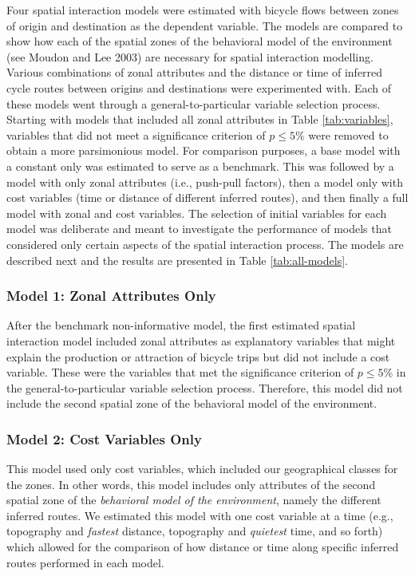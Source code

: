 \documentclass[smallextended]{svjour3}       %
\begin{document}
Four spatial interaction models were estimated with bicycle flows
between zones of origin and destination as the dependent variable. The
models are compared to show how each of the spatial zones of the
behavioral model of the environment (see Moudon and Lee 2003) are
necessary for spatial interaction modelling. Various combinations of
zonal attributes and the distance or time of inferred cycle routes
between origins and destinations were experimented with. Each of these
models went through a general-to-particular variable selection process.
Starting with models that included all zonal attributes in Table
\ref{tab:variables}, variables that did not meet a significance
criterion of \(p \le 5\)\% were removed to obtain a more parsimonious
model. For comparison purposes, a base model with a constant only was
estimated to serve as a benchmark. This was followed by a model with
only zonal attributes (i.e., push-pull factors), then a model only with
cost variables (time or distance of different inferred routes), and then
finally a full model with zonal and cost variables. The selection of
initial variables for each model was deliberate and meant to investigate
the performance of models that considered only certain aspects of the
spatial interaction process. The models are described next and the
results are presented in Table \ref{tab:all-models}.

\hypertarget{model-1-zonal-attributes-only}{%
\subsubsection{Model 1: Zonal Attributes
Only}\label{model-1-zonal-attributes-only}}

After the benchmark non-informative model, the first estimated spatial
interaction model included zonal attributes as explanatory variables
that might explain the production or attraction of bicycle trips but did
not include a cost variable. These were the variables that met the
significance criterion of \(p \le 5\)\% in the general-to-particular
variable selection process. Therefore, this model did not include the
second spatial zone of the behavioral model of the environment.

\hypertarget{model-2-cost-variables-only}{%
\subsubsection{Model 2: Cost Variables
Only}\label{model-2-cost-variables-only}}

This model used only cost variables, which included our geographical
classes for the zones. In other words, this model includes only
attributes of the second spatial zone of the \emph{behavioral model of
the environment}, namely the different inferred routes. We estimated
this model with one cost variable at a time (e.g., topography and
\emph{fastest} distance, topography and \emph{quietest} time, and so
forth) which allowed for the comparison of how distance or time along
specific inferred routes performed in each model.
\end{document}
